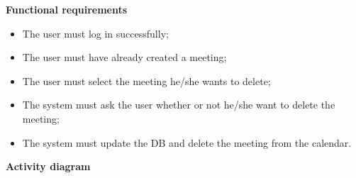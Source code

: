 \documentclass{article}
\begin{document}
	\bigskip
	\noindent
	\textbf{Functional requirements} \\
	\begin{itemize}
		\item The user must log in successfully;
		\item The user must have already created a meeting;
		\item The user must select the meeting he/she wants to delete;
		\item The system must ask the user whether or not he/she want to delete the meeting;
		\item The system must update the DB and delete the meeting from the calendar.
	\end{itemize}
	
	\newpage
	\noindent
	\textbf{Activity diagram} \\
	
\end{document}
